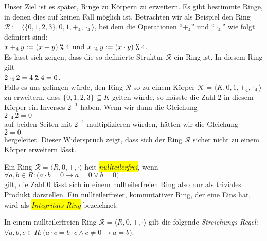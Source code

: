 Unser Ziel ist es sp\"{a}ter, Ringe zu K\"{o}rpern zu erweitern.  Es gibt bestimmte Ringe, in
denen dies auf keinen Fall m\"{o}glich ist.  Betrachten wir als Beispiel den Ring
$\mathcal{R} := \langle \{ 0, 1, 2, 3 \}, 0, 1, +_4, \cdot_4 \rangle$, bei dem die Operationen
``$+_4$'' und ``$\cdot_4$'' wie folgt definiert sind:
\\[0.2cm]
\hspace*{1.3cm}
$x +_4 y := (x + y) \;\texttt{\%}\; 4$ \quad und \quad
$x \cdot_4 y := (x \cdot y) \;\texttt{\%}\; 4$.
\\[0.2cm]
Es l\"{a}sst sich zeigen, dass die so definierte Struktur $\mathcal{R}$ ein Ring ist.  In
diesem Ring gilt
\\[0.2cm]
\hspace*{1.3cm}
$2 \cdot_4 2 = 4 \;\texttt{\%}\; 4 = 0$.
\\[0.2cm]
Falls es uns gelingen w\"{u}rde, den Ring $\mathcal{R}$ so zu einem K\"{o}rper 
$\mathcal{K} = \langle K, 0, 1, +_4, \cdot_4 \rangle$ zu erweitern, dass 
$\{0,1,2,3\} \subseteq K$ gelten w\"{u}rde, so m\"{u}sste die Zahl 
$2$ in diesem K\"{o}rper ein Inverses $2^{-1}$ haben.  Wenn wir dann die Gleichung
\\[0.2cm]
\hspace*{1.3cm}
$2 \cdot_4 2 = 0$
\\[0.2cm]
auf beiden Seiten mit $2^{-1}$ multiplizieren w\"{u}rden, h\"{a}tten wir die Gleichung
\\[0.2cm]
\hspace*{1.3cm}
$2 = 0$
\\[0.2cm]
hergeleitet.  Dieser Widerspruch zeigt, dass sich der Ring $\mathcal{R}$ sicher nicht zu
einem K\"{o}rper erweitern l\"{a}sst.

\begin{Definition}
  Ein Ring $\mathcal{R} = \langle R, 0, +, \cdot \rangle$ hei\3t \colorbox{yellow}{\emph{nullteilerfrei}}, wenn
  \\[0.2cm]
  \hspace*{1.3cm}
  $\forall a, b \in R: \bigl(a \cdot b = 0 \rightarrow a = 0 \vee b = 0\bigr)$
  \\[0.2cm]
  gilt, die Zahl $0$ l\"{a}sst sich in einem nullteilerfreien Ring also nur als triviales Produkt darstellen.
  Ein nullteilerfreier, kommutativer Ring, der eine Eins hat, wird als \colorbox{yellow}{\emph{Integrit\"{a}ts-Ring}}
  bezeichnet.
\eox
\end{Definition}

\remark
In einem nullteilerfreien Ring $\mathcal{R} = \langle R, 0, +, \cdot \rangle$ 
gilt die folgende \emph{Streichungs-Regel}:
\\[0.2cm]
\hspace*{1.3cm}
$\forall a,b,c \in R: \bigl(a \cdot c = b \cdot c \wedge c \not= 0 \rightarrow a = b)$.
\eox

